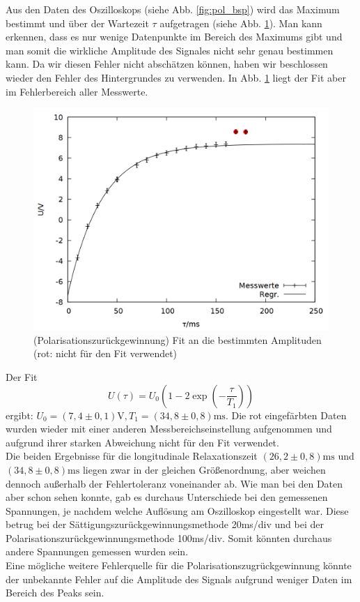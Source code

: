 Aus den Daten des Oszilloskops (siehe Abb. \ref{fig:pol_bsp}) wird das Maximum bestimmt und über der Wartezeit $\tau$ aufgetragen (siehe Abb. \ref{fig:pol_data}). Man kann erkennen, dass es nur wenige Datenpunkte im Bereich des Maximums gibt und man somit die wirkliche Amplitude des Signales nicht sehr genau bestimmen kann. Da wir diesen Fehler nicht abschätzen können, haben wir beschlossen wieder den Fehler des Hintergrundes zu verwenden. In Abb. \ref{fig:pol_data} liegt der Fit aber im Fehlerbereich aller Messwerte.
\begin{figure}[h]
\centering
\includegraphics[width=0.75\linewidth]{data/p402_443_data/polarisationszurueckgewinnung/out_pol.png}
\caption{(Polarisationszurückgewinnung) Fit an die bestimmten Amplituden (rot: nicht für den Fit verwendet)}
\label{fig:pol_data}
\end{figure}

Der Fit $$U(\tau) = U_0\left(1-2\exp{\left(-\frac{\tau}{T_1}\right)}\right)$$ ergibt: $U_0 = (7,4\pm 0,1)\si{\volt}, T_1 = (34,8\pm 0,8) \si{\milli\second}$. Die rot eingefärbten Daten wurden wieder mit einer anderen Messbereichseinstellung aufgenommen und aufgrund ihrer starken Abweichung nicht für den Fit verwendet.\\

Die beiden Ergebnisse für die longitudinale Relaxationszeit $(26,2\pm 0,8) \si{\milli\second}$ und $(34,8\pm 0,8) \si{\milli\second}$ liegen zwar in der gleichen Größenordnung, aber weichen dennoch außerhalb der Fehlertoleranz voneinander ab. Wie man bei den Daten aber schon sehen konnte, gab es durchaus Unterschiede bei den gemessenen Spannungen, je nachdem welche Auflösung am Oszilloskop eingestellt war. Diese betrug bei der Sättigungszurückgewinnungsmethode 20\si{\milli\second}/div und bei der Polarisationszurückgewinnungsmethode 100\si{\milli\second}/div. Somit könnten durchaus andere Spannungen gemessen wurden sein.\\
Eine mögliche weitere Fehlerquelle für die Polarisationszugrückgewinnung könnte der unbekannte Fehler auf die Amplitude des Signals aufgrund weniger Daten im Bereich des Peaks sein.


